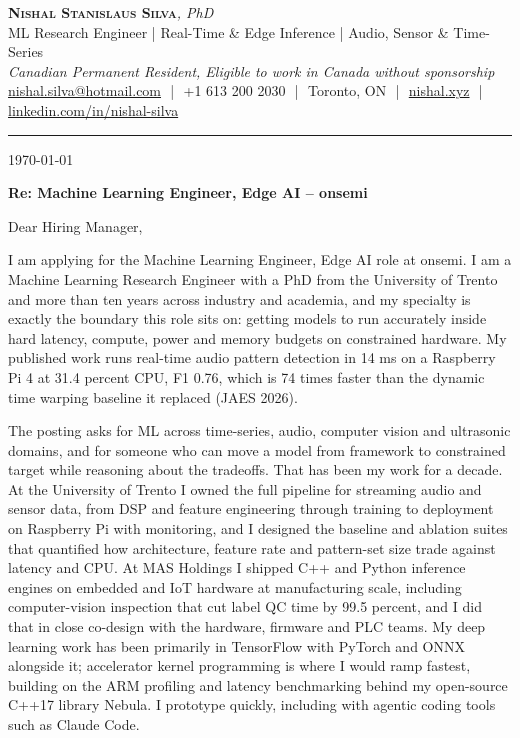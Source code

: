 \documentclass[11pt]{article}
\makeatletter
\newcommand{\clName}{Nishal Stanislaus Silva}
\newcommand{\clEmail}{nishal.silva@hotmail.com}
\newcommand{\clPhone}{+1 613 200 2030}
\newcommand{\clCity}{Toronto, ON}
\newcommand{\clSite}{https://nishal.xyz}
\newcommand{\clLinkedIn}{https://www.linkedin.com/in/nishal-silva}
\newcommand{\clStatus}{Canadian Permanent Resident, Eligible to work in Canada without sponsorship}
\newcommand{\clTagline}{ML Research Engineer | Real-Time \& Edge Inference | Audio, Sensor \& Time-Series}
\newcommand{\clRole}{Machine Learning Engineer, Edge AI}
\newcommand{\clCompany}{onsemi}
\newcommand{\clAddressee}{Dear Hiring Manager,}
\makeatother
\begin{document}
\pagestyle{empty}

\begin{center}
    {\LARGE \scshape \textbf{\clName}}{\large \textit{, PhD}}
    \\[1pt]
    {\small \clTagline}
    \\[1pt]
    {\footnotesize\textit{\clStatus}}
    \\[1pt]
    {\small
    \href{mailto:\clEmail}{\clEmail}
    \,\,|\,\, \clPhone
    \,\,|\,\, \clCity
    \,\,|\,\, \href{\clSite}{nishal.xyz}
    \,\,|\,\, \href{\clLinkedIn}{linkedin.com/in/nishal-silva}}
\end{center}

\rule{\linewidth}{0.4pt}\vspace{0.6em}

\today

\textbf{Re: \clRole{} -- \clCompany{}}

\clAddressee

I am applying for the Machine Learning Engineer, Edge AI role at onsemi. I am a Machine Learning Research Engineer with a PhD from the University of Trento and more than ten years across industry and academia, and my specialty is exactly the boundary this role sits on: getting models to run accurately inside hard latency, compute, power and memory budgets on constrained hardware. My published work runs real-time audio pattern detection in 14 ms on a Raspberry Pi 4 at 31.4 percent CPU, F1 0.76, which is 74 times faster than the dynamic time warping baseline it replaced (JAES 2026).

The posting asks for ML across time-series, audio, computer vision and ultrasonic domains, and for someone who can move a model from framework to constrained target while reasoning about the tradeoffs. That has been my work for a decade. At the University of Trento I owned the full pipeline for streaming audio and sensor data, from DSP and feature engineering through training to deployment on Raspberry Pi with monitoring, and I designed the baseline and ablation suites that quantified how architecture, feature rate and pattern-set size trade against latency and CPU. At MAS Holdings I shipped C++ and Python inference engines on embedded and IoT hardware at manufacturing scale, including computer-vision inspection that cut label QC time by 99.5 percent, and I did that in close co-design with the hardware, firmware and PLC teams. My deep learning work has been primarily in TensorFlow with PyTorch and ONNX alongside it; accelerator kernel programming is where I would ramp fastest, building on the ARM profiling and latency benchmarking behind my open-source C++17 library Nebula. I prototype quickly, including with agentic coding tools such as Claude Code.
\end{document}
